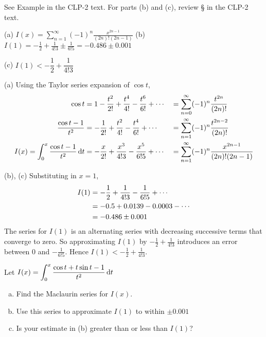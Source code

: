 \begin{hint}
See Example  in the
CLP-2 text.
For parts (b) and (c), review  \S {} in the
CLP-2 text.

\end{hint}

\begin{answer}
(a)
$\displaystyle I(x)=\sum\limits_{n=1}^\infty(-1)^n\frac{x^{2n-1}}{(2n)!(2n-1)}$
\qquad (b)
$\displaystyle I(1)= -\frac{1}{2}+\frac{1}{4!3} \pm  \frac{1}{6!5}
        =-0.486\pm0.001$

\noindent (c)
$I(1)<-\dfrac{1}{2}+\dfrac{1}{4!3}$

\end{answer}

\begin{solution} (a)
Using the Taylor series expansion of $\cos t$,
\begin{alignat*}{3}
\cos t&=1-\frac{t^2}{2!}+\frac{t^4}{4!}-\frac{t^6}{6!}+\cdots
         &&=\sum_{n=0}^\infty(-1)^n\frac{t^{2n}}{(2n)!}\\
\frac{\cos t-1}{t^2}&= -\frac{1}{2!}+\frac{t^2}{4!}-\frac{t^4}{6!}+\cdots
         &&=\sum_{n=1}^\infty(-1)^n\frac{t^{2n-2}}{(2n)!}\\
I(x)=\int_0^x \frac{\cos t-1}{t^2}\,\mathrm{d}t
      &=-\frac{x}{2!}+\frac{x^3}{4!3}-\frac{x^5}{6!5}+\cdots
      &&=\sum_{n=1}^\infty(-1)^n\frac{x^{2n-1}}{(2n)!(2n-1)}
\end{alignat*}


\noindent (b), (c)  Substituting in $x=1$,
\begin{align*}
I(1)&=-\frac{1}{2}+\frac{1}{4!3}-\frac{1}{6!5}
+\cdots\\
&=-0.5+0.0139-0.0003-\cdots\cr
&=-0.486\pm0.001
\end{align*}
The series for $I(1)$ is an alternating series with decreasing
successive terms that converge to zero. So approximating
$I(1)$ by $-\frac{1}{2}+\frac{1}{4!3}$ introduces an error
between $0$ and $-\frac{1}{6!5}$. Hence $I(1)<-\frac{1}{2}+\frac{1}{4!3}$.


\end{solution}


\begin{question}[1998A]
Let $\displaystyle I(x)=\int_0^x\frac{\cos t+t\sin t-1}{t^2}\,\mathrm{d}t$

\begin{enumerate}[(a)]
\item
Find the Maclaurin series for $I(x)$.
\item
Use this series to approximate $I(1)$ to within $\pm0.001$
\item
Is your estimate in (b) greater than or less than $I(1)$?
\end{enumerate}
\end{question}

